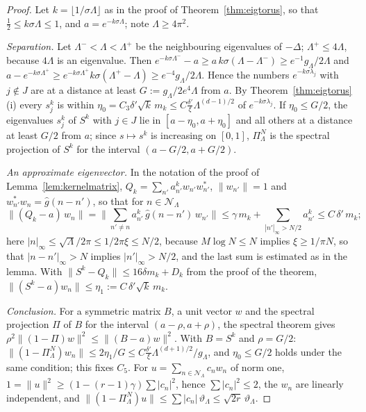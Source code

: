 \begin{proof}
Let $k=\lfloor1/\sigma\Lambda\rfloor$ as in the proof of Theorem~\ref{thm:eigtorus}, so that $\frac12\le k\sigma\Lambda\le1$, and $a=e^{-k\sigma\Lambda}$; note $\Lambda\ge4\pi^2$.

\emph{Separation.} Let $\Lambda^-<\Lambda<\Lambda^+$ be the neighbouring eigenvalues of $-\Delta$; $\Lambda^+\le4\Lambda$, because $4\Lambda$ is an eigenvalue. Then $e^{-k\sigma\Lambda^-}-a\ge a\,k\sigma(\Lambda-\Lambda^-)\ge e^{-1}g_\Lambda/2\Lambda$ and $a-e^{-k\sigma\Lambda^+}\ge e^{-k\sigma\Lambda^+}k\sigma(\Lambda^+-\Lambda)\ge e^{-4}g_\Lambda/2\Lambda$. Hence the numbers $e^{-k\sigma\lambda_j}$ with $j\notin J$ are at a distance at least $G:=g_\Lambda/2e^4\Lambda$ from $a$. By Theorem~\ref{thm:eigtorus}(i) every $s_j^k$ is within $\eta_0=C_3\delta'\sqrt k\,m_k\le C\frac{\delta'}\xi\Lambda^{(d-1)/2}$ of $e^{-k\sigma\lambda_j}$. If $\eta_0\le G/2$, the eigenvalues $s_j^k$ of $S^k$ with $j\in J$ lie in $[a-\eta_0,a+\eta_0]$ and all others at a distance at least $G/2$ from $a$; since $s\mapsto s^k$ is increasing on $[0,1]$, $\Pi^N_\Lambda$ is the spectral projection of $S^k$ for the interval $(a-G/2,a+G/2)$.

\emph{An approximate eigenvector.} In the notation of the proof of Lemma~\ref{lem:kernelmatrix}, $Q_k=\sum_{n'}a_{n'}^kw_{n'}w_{n'}^*$, $\|w_{n'}\|=1$ and $w_{n'}^*w_n=\hat g(n-n')$, so that for $n\in\mathcal N_\Lambda$
\[
\big\|(Q_k-a)\,w_n\big\|=\Big\|\sum_{n'\ne n}a_{n'}^k\,\hat g(n-n')\,w_{n'}\Big\|\le\gamma\,m_k+\sum_{|n'|_\infty>N/2}a_{n'}^k\le C\,\delta'\,m_k ;
\]
here $|n|_\infty\le\sqrt\Lambda/2\pi\le1/2\pi\xi\le N/2$, because $M\log N\le N$ implies $\xi\ge1/\pi N$, so that $|n-n'|_\infty>N$ implies $|n'|_\infty>N/2$, and the last sum is estimated as in the lemma. With $\|S^k-Q_k\|\le16\delta m_k+D_k$ from the proof of the theorem, $\|(S^k-a)w_n\|\le\eta_1:=C\,\delta'\sqrt k\,m_k$.

\emph{Conclusion.} For a symmetric matrix $B$, a unit vector $w$ and the spectral projection $\Pi$ of $B$ for the interval $(a-\rho,a+\rho)$, the spectral theorem gives $\rho^2\|(1-\Pi)w\|^2\le\|(B-a)w\|^2$. With $B=S^k$ and $\rho=G/2$: $\|(1-\Pi^N_\Lambda)w_n\|\le2\eta_1/G\le C\frac{\delta'}\xi\Lambda^{(d+1)/2}/g_\Lambda$, and $\eta_0\le G/2$ holds under the same condition; this fixes $C_5$. For $u=\sum_{n\in\mathcal N_\Lambda}c_nw_n$ of norm one, $1=\|u\|^2\ge(1-(r-1)\gamma)\sum|c_n|^2$, hence $\sum|c_n|^2\le2$, the $w_n$ are linearly independent, and $\|(1-\Pi^N_\Lambda)u\|\le\sum|c_n|\,\vartheta_\Lambda\le\sqrt{2r}\,\vartheta_\Lambda$.
\end{proof}

